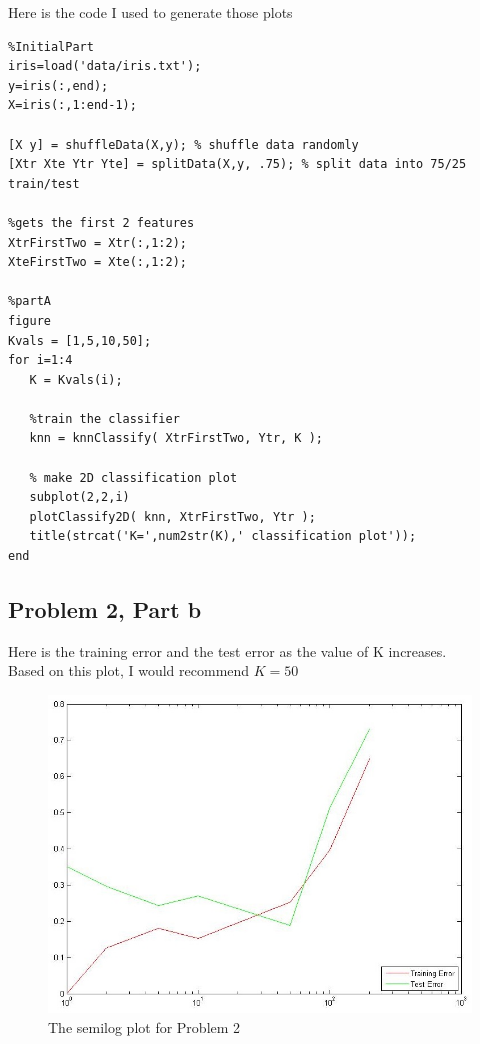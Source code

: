 \documentclass[11pt,psfig]{article}
\begin{document}
\newpage

Here is the code I used to generate those plots

\begin{verbatim}
%InitialPart
iris=load('data/iris.txt'); 
y=iris(:,end); 
X=iris(:,1:end-1);

[X y] = shuffleData(X,y); % shuffle data randomly
[Xtr Xte Ytr Yte] = splitData(X,y, .75); % split data into 75/25 train/test

%gets the first 2 features
XtrFirstTwo = Xtr(:,1:2);
XteFirstTwo = Xte(:,1:2);

%partA
figure
Kvals = [1,5,10,50];
for i=1:4
   K = Kvals(i);
   
   %train the classifier
   knn = knnClassify( XtrFirstTwo, Ytr, K );
   
   % make 2D classification plot
   subplot(2,2,i)
   plotClassify2D( knn, XtrFirstTwo, Ytr );
   title(strcat('K=',num2str(K),' classification plot'));
end
\end{verbatim}

\newpage

\subsection*{Problem 2, Part b}

Here is the training error and the test error as the value of K increases. \\
Based on this plot, I would recommend $K=50$

\begin{figure}[H]
\centering
\includegraphics[width=\columnwidth]{prob2bPlot.jpg}
\caption{The semilog plot for Problem 2}
\end{figure}
\end{document}

